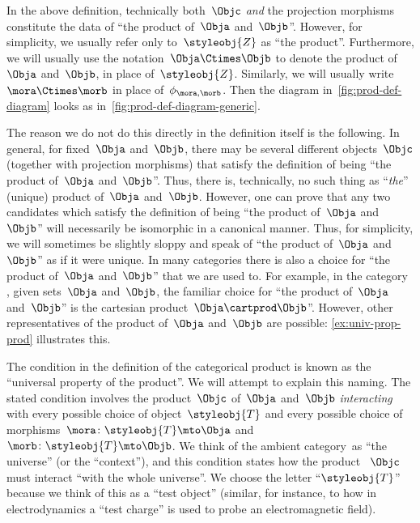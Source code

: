 \begin{remark}
	\label{prod unique up to iso}
	In the above definition, technically both~$\Objc$ \emph{and} the projection morphisms constitute the data of ``the product of~$\Obja$ and~$\Objb$''.
	However, for simplicity, we usually refer only to~$\styleobj{Z}$ as ``the product''.
	Furthermore, we will usually use the notation~$\Obja \Ctimes \Objb$ to denote the product of~$\Obja$ and~$\Objb$, in place of~$\styleobj{Z}$.
	Similarly, we will usually write~$\mora \Ctimes \morb$ in place of~$\phi_{\mora, \morb}$.
	Then the diagram in~\cref{fig:prod-def-diagram} looks as in~\cref{fig:prod-def-diagram-generic}.

	The reason we do not do this directly in the definition itself is the following.
	In general, for fixed~$\Obja$ and~$\Objb$, there may be several different objects~$\Objc$ (together with projection morphisms) that satisfy the definition of being ``the product of~$\Obja$ and~$\Objb$''.
	Thus, there is, technically, no such thing as ``\emph{the}'' (unique) product of~$\Obja$ and~$\Objb$.
	However, one can prove that any two candidates which satisfy the definition of being ``the product of~$\Obja$ and~$\Objb$'' will necessarily be isomorphic in a canonical manner.
	Thus, for simplicity, we will sometimes be slightly sloppy and speak of ``the product of~$\Obja$ and~$\Objb$'' as if it were unique.
	In many categories there is also a choice for ``the product of~$\Obja$ and~$\Objb$'' that we are used to.
	For example, in the category \Set, given sets~$\Obja$ and~$\Objb$, the familiar choice for ``the product of~$\Obja$ and~$\Objb$'' is the cartesian product~$\Obja \cartprod \Objb$''.
	However, other representatives of the product of~$\Obja$ and~$\Objb$ are possible: \cref{ex:univ-prop-prod} illustrates this.
\end{remark}

\begin{remark}
	The condition in the definition of the categorical product is known as the ``universal property of the product''.
	We will attempt to explain this naming.
	The stated condition involves the product~$\Objc$ of~$\Obja$ and~$\Objb$ \emph{interacting} with every possible choice of object~$\styleobj{T}$ and every possible choice of morphisms~$\mora \colon \styleobj{T} \mto \Obja$ and~$\morb\colon \styleobj{T} \mto \Objb$.
	We think of the ambient category~\CatC as ``the universe'' (or the ``context''), and this condition states how the product ~$\Objc$ must interact ``with the whole universe''.
	We choose the letter ``$\styleobj{T}$'' because we think of this as a ``test object'' (similar, for instance,  to how in electrodynamics a ``test charge'' is used to probe an electromagnetic field).
\end{remark}

